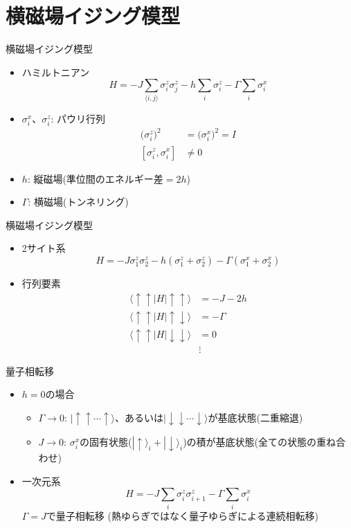 \section{横磁場イジング模型}

\begin{frame}[t,fragile]{横磁場イジング模型}
  \begin{itemize}
  \item ハミルトニアン
    \[
      H = - J \sum_{\langle i,j \rangle} \sigma_i^z \sigma_j^z - h \sum_i \sigma_i^z - \Gamma \sum_i \sigma_i^x
    \]
  \item $\sigma_i^x$、$\sigma_i^z$: パウリ行列
    \begin{align*}
      \big(\sigma_i^z\big)^2 &= \big(\sigma_i^x\big)^2 = I \\
      [ \sigma_i^z, \sigma_i^x ] &\ne 0
    \end{align*}
  \item $h$: 縦磁場(準位間のエネルギー差$=2h$)
  \item $\Gamma$: 横磁場(トンネリング)
  \end{itemize}
\end{frame}

\begin{frame}[t,fragile]{横磁場イジング模型}
  \begin{itemize}
  \item 2サイト系
    \[
      H = -J \sigma_1^z \sigma_2^z - h (\sigma_1^z + \sigma_2^z) - \Gamma (\sigma_1^x + \sigma_2^x)
    \]
  \item 行列要素
    \begin{align*}
      \langle \uparrow \uparrow | H | \uparrow \uparrow \rangle &= -J - 2h \\
      \langle \uparrow \uparrow | H | \uparrow \downarrow \rangle &= -\Gamma \\
      \langle \uparrow \uparrow | H | \downarrow \downarrow \rangle &= 0 \\
      &\vdots
    \end{align*}
  \end{itemize}
\end{frame}

\begin{frame}[t,fragile]{量子相転移}
  \begin{itemize}
  \item $h=0$の場合
    \begin{itemize}
    \item $\Gamma \rightarrow 0$: $|\uparrow\uparrow\cdots\uparrow\rangle$、あるいは$|\downarrow\downarrow\cdots\downarrow\rangle$が基底状態(二重縮退)
    \item $J \rightarrow 0$: $\sigma_i^x$の固有状態($|\uparrow\rangle_i + |\downarrow\rangle_i$)の積が基底状態(全ての状態の重ね合わせ)
    \end{itemize}
  \item 一次元系
    \[
      H = - J \sum_{i} \sigma_i^z \sigma_{i+1}^z - \Gamma \sum_i \sigma_i^x
    \]
    $\Gamma = J$で量子相転移 (熱ゆらぎではなく量子ゆらぎによる連続相転移)  
  \end{itemize}
\end{frame}


